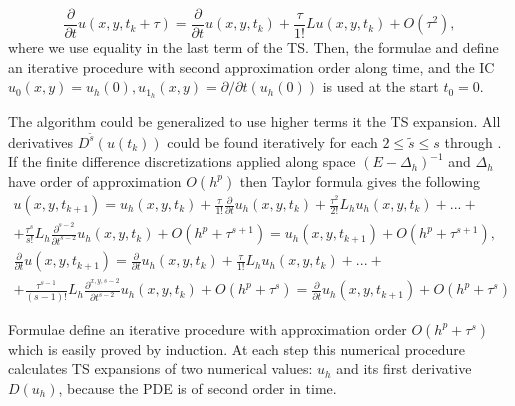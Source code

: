 \documentclass[11pt,a4paper,twoside]{article}
\begin{document}
\begin{equation}\label{taylor22}
\frac{ \partial } { \partial t } u( x,y,t_k+\tau ) = \frac{\partial } { \partial t }u(x,y,t_k) + \frac{\tau } {1!} Lu(x,y,t_k) + O(\tau^2),
\end{equation}
where we use equality  in the last term of the TS. Then, the formulae  and  define an iterative procedure with second approximation order along time, and the IC $u_0(x,y) = u_h(0), u_{1_h}(x,y) = \partial / \partial t (u_h(0))$ is used at the start $t_0 = 0$.

The algorithm could be generalized to use higher terms it the TS expansion. All derivatives $D^{\tilde s}(u(t_k))$ could be found iteratively for each $2 \leq \tilde s \leq s$ through . If the finite difference discretizations applied along space $(E - \Delta_h)^{-1}$ and $\Delta_h$ have order of approximation $O(h^p)$ then Taylor formula gives the following
\begin{align} \label{GeneralIt}
u(x,y,t_{k+1}) = u_h(x,y,t_k) + \frac{\tau } {1!}  \frac{\partial}{\partial t} u_h(x,y,t_k) + \frac{ \tau^2} { 2!}L_h u_h(x,y,t_k) +... + \nonumber
\\ + \frac{\tau^s}{ s! }L_h \frac{\partial^{s-2}}{\partial t^{s-2}} u_h(x,y,t_k) + O(h^p + \tau^{s+1}) = u_h(x,y,t_{k+1}) + O(h^p + \tau^{s+1}), \nonumber
\\  \frac{\partial}{\partial t}u(x,y,t_{k+1}) = \frac{\partial}{\partial t} u_h(x,y,t_k) + \frac{\tau } {1!}  L_h u_h(x,y,t_k) + ... + \nonumber
\\ + \frac{\tau^{s-1}}{ (s-1)! } L_h \frac{\partial^{x,y,s-2} }{\partial t^{s-2}} u_h(x,y,t_k)  + O(h^p + \tau^s) = \frac{\partial}{\partial t}u_h(x,y,t_{k+1}) + O(h^p + \tau^s)
\end{align}

Formulae  define an iterative procedure with approximation order $O(h^p + \tau^s)$ which is easily proved by induction. At each step this numerical procedure calculates TS expansions of two numerical values: $u_h$ and its first derivative $D(u_h)$, because the PDE is of second order in time. 

\end{document}
